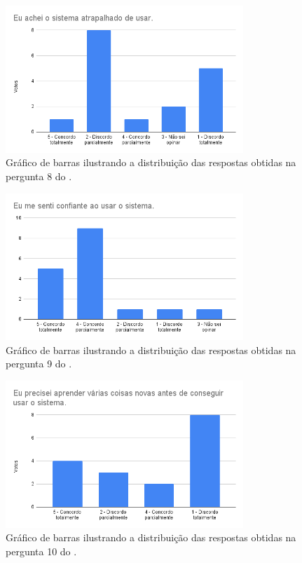 \documentclass[12pt]{tcc}
\begin{document}
	\begin{figure}[!ht]
		\centering
		\includegraphics[width=0.8\textwidth]{figures/respostas-pergunta-8.png}
		\caption[Respostas obtidas na pergunta 8 do formulário de avaliação]{Gráfico de barras ilustrando a distribuição das respostas obtidas na pergunta 8 do .}
		\label{fig:respostas-pergunta-8}
	\end{figure}

	\begin{figure}[!ht]
		\centering
		\includegraphics[width=0.8\textwidth]{figures/respostas-pergunta-9.png}
		\caption[Respostas obtidas na pergunta 9 do formulário de avaliação]{Gráfico de barras ilustrando a distribuição das respostas obtidas na pergunta 9 do .}
		\label{fig:respostas-pergunta-9}
	\end{figure}

	\begin{figure}[!ht]
		\centering
		\includegraphics[width=0.8\textwidth]{figures/respostas-pergunta-10.png}
		\caption[Respostas obtidas na pergunta 10 do formulário de avaliação]{Gráfico de barras ilustrando a distribuição das respostas obtidas na pergunta 10 do .}
		\label{fig:respostas-pergunta-10}
	\end{figure}
\end{document}
